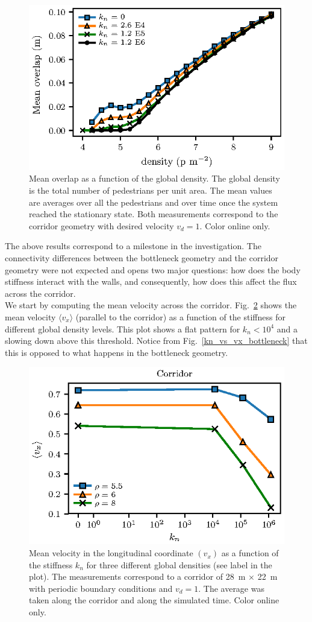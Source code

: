 \documentclass[preprint,12pt]{elsarticle}
\begin{document}
\begin{figure}[htbp!]
\centering
\includegraphics[width=0.7\columnwidth]
{./overlap_vs_dens_multi_kn.eps}
\caption{\label{overlap_dens} Mean overlap as a function of the 
global density. The global density is the total number of pedestrians per unit 
area. The mean values are averages over all the pedestrians and over time once 
the system reached the stationary state. Both measurements correspond to 
the corridor geometry with desired velocity $v_d=1$. Color 
online only. }
\end{figure}


The above results correspond to a milestone in the 
investigation. The connectivity differences between the bottleneck geometry 
and the corridor geometry were not expected and opens two major questions: how 
does the body stiffness interact with the walls, and consequently, how does 
this affect the flux across the corridor.\\ 

We start by computing the mean velocity across the corridor.  
Fig.~\ref{kn_vs_vx_corridor} shows the mean velocity 
$\langle v_x\rangle$ (parallel to the corridor) as a function 
of the stiffness for different global density levels. This 
plot shows a flat pattern for $k_n<10^4$ and a slowing down above this 
threshold. Notice from Fig.~\ref{kn_vs_vx_bottleneck} that this is opposed
to what happens in the bottleneck geometry. \\


\begin{figure}[htbp!]
\centering
\includegraphics[width=0.7\columnwidth]{./kn_vs_vx_corridor.eps}
\caption{\label{kn_vs_vx_corridor} Mean velocity in the longitudinal coordinate $(v_x)$
 as a function of the stiffness $k_n$ for three different global densities (see label in the plot). 
 The measurements correspond to a corridor of 28~m $\times$ 22~m with periodic boundary conditions and $v_d=1$.
 The average was taken along the corridor and along the simulated time. Color online only.      }
\end{figure}
\end{document}
